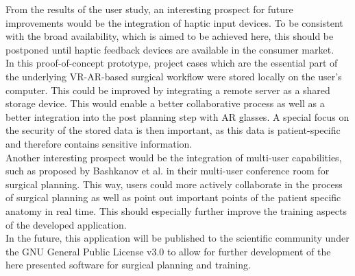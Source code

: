 From the results of the user study, an interesting prospect for
future improvements would be the integration of 
haptic input devices. 
To be consistent with the broad availability, which is
aimed to be achieved here, this should be postponed
until haptic feedback devices are available
in the consumer market. 
\\ In this proof-of-concept prototype, project
cases which are the essential part of the underlying VR-AR-based
surgical workflow were stored locally on the user's 
computer. This could be improved by integrating a remote server as 
a shared storage device. 
This would enable a better collaborative process as well as a 
better integration into the post planning step with AR glasses.
A special focus on the security of the stored data is then 
important, as this data is patient-specific and therefore 
contains sensitive information.
\\ Another interesting prospect would be the integration of multi-user
capabilities, such as proposed by Bashkanov et al. \cite{RN43} in their
multi-user conference room for surgical planning. 
This way, users could more actively collaborate in the process 
of surgical planning as well as point out 
important points of the patient specific anatomy in real time.
This should especially further improve the training aspects of 
the developed application. 
\\ In the future, this application will be published to the 
scientific community under the GNU General Public License v3.0 \cite{gpl}
to allow for further 
development of the here presented software for surgical planning 
and training. 
